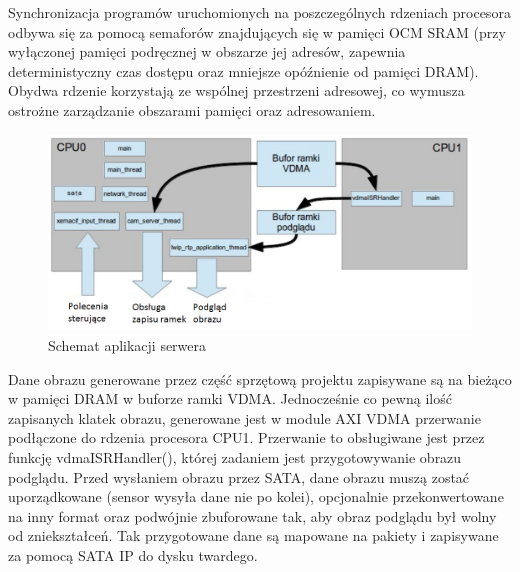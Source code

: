 \documentclass[a4paper,11pt,oneside]{report}  %
\begin{document}
Synchronizacja programów uruchomionych na poszczególnych rdzeniach procesora odbywa się za pomocą semaforów znajdujących się w pamięci OCM SRAM (przy wyłączonej pamięci podręcznej w obszarze jej adresów, zapewnia deterministyczny czas dostępu oraz mniejsze opóźnienie od pamięci DRAM). Obydwa rdzenie korzystają ze wspólnej przestrzeni adresowej, co wymusza ostrożne zarządzanie obszarami pamięci oraz adresowaniem.

 
\begin{figure}[H]
	\centering
	\includegraphics[width=14cm]{data9.png}
	\caption{Schemat aplikacji serwera}
	\label{fig:Zynq3}
\end{figure}

Dane obrazu generowane przez część sprzętową projektu zapisywane są na bieżąco w pamięci DRAM w buforze ramki VDMA. Jednocześnie co pewną ilość zapisanych klatek obrazu, generowane jest w module AXI VDMA przerwanie podłączone do rdzenia procesora CPU1. Przerwanie to obsługiwane jest przez funkcję vdmaISRHandler(), której zadaniem jest przygotowywanie obrazu podglądu. Przed wysłaniem obrazu przez SATA, dane obrazu muszą zostać uporządkowane (sensor wysyła dane nie po kolei), opcjonalnie przekonwertowane na inny format oraz podwójnie zbuforowane tak, aby obraz podglądu był wolny od zniekształceń. Tak przygotowane dane są mapowane na pakiety 
i zapisywane za pomocą SATA IP do dysku twardego.
\end{document}
